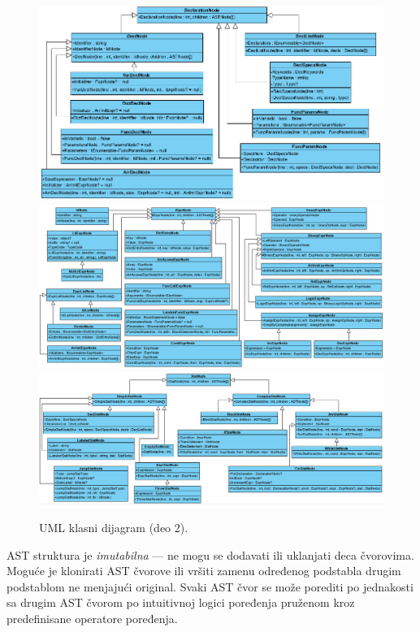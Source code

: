 \begin{figure}[h!]
\centering
\includegraphics[scale=0.65]{images/uml/DeclarationNode.png}
\includegraphics[scale=0.55]{images/uml/ExpressionNode.png}
\includegraphics[scale=0.55]{images/uml/StatementNode.png}
\caption{UML klasni dijagram (deo 2).}
\label{fig:UMLASTNode2}
\end{figure}

AST struktura je \emph{imutabilna} --- ne mogu se dodavati ili uklanjati deca čvorovima. Moguće je klonirati AST čvorove ili vršiti zamenu određenog podstabla drugim podstablom ne menjajući original. Svaki AST čvor se može porediti po jednakosti sa drugim AST čvorom po intuitivnoj logici poređenja pruženom kroz predefinisane operatore poređenja.
